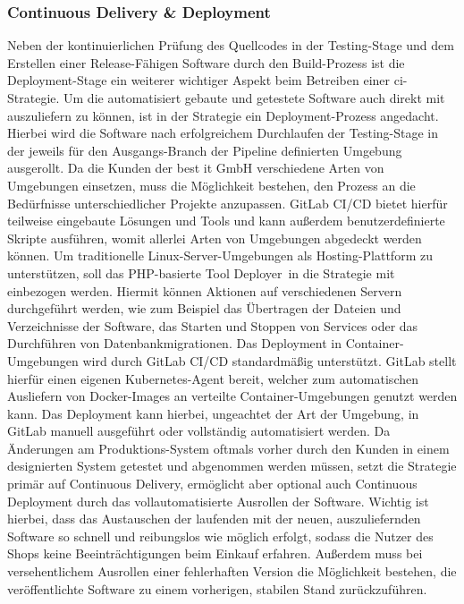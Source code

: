 \subsubsection{Continuous Delivery \& Deployment}

Neben der kontinuierlichen Prüfung des Quellcodes in der Testing-Stage und dem Erstellen einer Release-Fähigen
Software durch den Build-Prozess ist die Deployment-Stage ein weiterer wichtiger Aspekt beim Betreiben einer
\acrshort{ci}-Strategie.
Um die automatisiert gebaute und getestete Software auch direkt mit auszuliefern zu können, ist in der Strategie ein
Deployment-Prozess angedacht.
Hierbei wird die Software nach erfolgreichem Durchlaufen der Testing-Stage in der jeweils für den Ausgangs-Branch der
Pipeline definierten Umgebung ausgerollt.
Da die Kunden der best it GmbH verschiedene Arten von Umgebungen einsetzen, muss die Möglichkeit bestehen, den Prozess
an die Bedürfnisse unterschiedlicher Projekte anzupassen.
GitLab CI/CD bietet hierfür teilweise eingebaute Lösungen und Tools und kann außerdem benutzerdefinierte Skripte
ausführen, womit allerlei Arten von Umgebungen abgedeckt werden können.
Um traditionelle Linux-Server-Umgebungen als Hosting-Plattform zu unterstützen, soll das PHP-basierte Tool
\glqq Deployer\grqq\ in die Strategie mit einbezogen werden.
Hiermit können Aktionen auf verschiedenen Servern durchgeführt werden, wie zum Beispiel das Übertragen der Dateien und
Verzeichnisse der Software, das Starten und Stoppen von Services oder das Durchführen von Datenbankmigrationen.
Das Deployment in Container-Umgebungen wird durch GitLab CI/CD standardmäßig unterstützt.
GitLab stellt hierfür einen eigenen Kubernetes-Agent bereit, welcher zum automatischen Ausliefern von Docker-Images an
verteilte Container-Umgebungen genutzt werden kann.
Das Deployment kann hierbei, ungeachtet der Art der Umgebung, in GitLab manuell ausgeführt oder vollständig
automatisiert werden.
Da Änderungen am Produktions-System oftmals vorher durch den Kunden in einem designierten System getestet und
abgenommen werden müssen, setzt die Strategie primär auf Continuous Delivery, ermöglicht aber optional auch
Continuous Deployment durch das vollautomatisierte Ausrollen der Software.
Wichtig ist hierbei, dass das Austauschen der laufenden mit der neuen, auszuliefernden Software so schnell und
reibungslos wie möglich erfolgt, sodass die Nutzer des Shops keine Beeinträchtigungen beim Einkauf erfahren.
Außerdem muss bei versehentlichem Ausrollen einer fehlerhaften Version die Möglichkeit bestehen, die veröffentlichte
Software zu einem vorherigen, stabilen Stand zurückzuführen.

